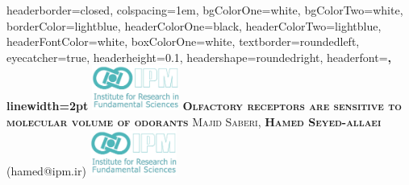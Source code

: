 \documentclass[a1paper,fontscale=0.6]{baposter} %
\begin{document}
\begin{poster}
{
headerborder=closed, %
colspacing=1em, %
bgColorOne=white, %
bgColorTwo=white, %
borderColor=lightblue, %
headerColorOne=black, %
headerColorTwo=lightblue, %
headerFontColor=white, %
boxColorOne=white, %
textborder=roundedleft, %
eyecatcher=true, %
headerheight=0.1\textheight, %
headershape=roundedright, %
headerfont=\Large\bf\textsc, %
linewidth=2pt %
}
%
{\includegraphics[height=4em]{fig/logo.jpg}} %
{\bf\textsc{Olfactory receptors are sensitive to molecular volume of odorants}\vspace{0.5em}} %
{\textsc{ Majid Saberi, \bf{Hamed Seyed-allaei} \vspace{0.5em} }(hamed@ipm.ir)}
{\includegraphics[height=4em]{fig/logo.jpg}} %




\end{poster}
\end{document}
